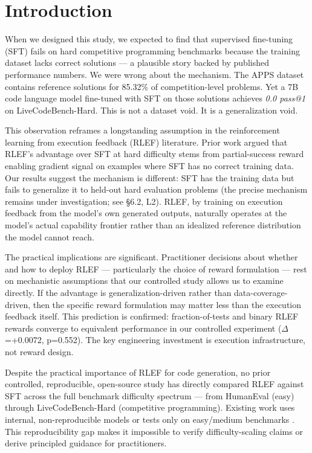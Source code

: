 \section{Introduction}

When we designed this study, we expected to find that supervised fine-tuning (SFT) fails on hard competitive programming benchmarks because the training dataset lacks correct solutions --- a plausible story backed by published performance numbers. We were wrong about the mechanism. The APPS dataset contains reference solutions for 85.32\% of competition-level problems. Yet a 7B code language model fine-tuned with SFT on those solutions achieves \textit{0.0 pass@1} on LiveCodeBench-Hard. This is not a dataset void. It is a generalization void.

This observation reframes a longstanding assumption in the reinforcement learning from execution feedback (RLEF) literature. Prior work argued that RLEF's advantage over SFT at hard difficulty stems from partial-success reward enabling gradient signal on examples where SFT has no correct training data. Our results suggest the mechanism is different: SFT has the training data but fails to generalize it to held-out hard evaluation problems (the precise mechanism remains under investigation; see \S6.2, L2). RLEF, by training on execution feedback from the model's own generated outputs, naturally operates at the model's actual capability frontier rather than an idealized reference distribution the model cannot reach.

The practical implications are significant. Practitioner decisions about whether and how to deploy RLEF --- particularly the choice of reward formulation --- rest on mechanistic assumptions that our controlled study allows us to examine directly. If the advantage is generalization-driven rather than data-coverage-driven, then the specific reward formulation may matter less than the execution feedback itself. This prediction is confirmed: fraction-of-tests and binary RLEF rewards converge to equivalent performance in our controlled experiment ($\Delta$=+0.0072, p=0.552). The key engineering investment is execution infrastructure, not reward design.

Despite the practical importance of RLEF for code generation, no prior controlled, reproducible, open-source study has directly compared RLEF against SFT across the full benchmark difficulty spectrum --- from HumanEval (easy) through LiveCodeBench-Hard (competitive programming). Existing work uses internal, non-reproducible models \cite{Gehring2024RLEF} or tests only on easy/medium benchmarks \cite{Le2022CodeRL,Majeed2023PPOCoder,Liu2023RLTF}. This reproducibility gap makes it impossible to verify difficulty-scaling claims or derive principled guidance for practitioners.

